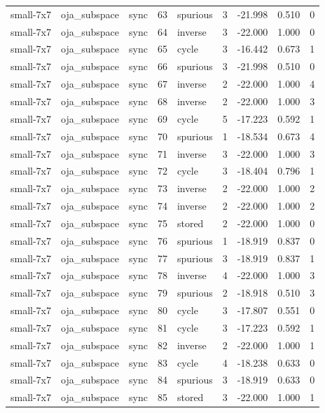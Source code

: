 \begin{tabular}{lllrlrrrr}
small-7x7 & oja\_subspace & sync & 63 & spurious & 3 & -21.998 & 0.510 & 0 \\
small-7x7 & oja\_subspace & sync & 64 & inverse & 3 & -22.000 & 1.000 & 0 \\
small-7x7 & oja\_subspace & sync & 65 & cycle & 3 & -16.442 & 0.673 & 1 \\
small-7x7 & oja\_subspace & sync & 66 & spurious & 3 & -21.998 & 0.510 & 0 \\
small-7x7 & oja\_subspace & sync & 67 & inverse & 2 & -22.000 & 1.000 & 4 \\
small-7x7 & oja\_subspace & sync & 68 & inverse & 2 & -22.000 & 1.000 & 3 \\
small-7x7 & oja\_subspace & sync & 69 & cycle & 5 & -17.223 & 0.592 & 1 \\
small-7x7 & oja\_subspace & sync & 70 & spurious & 1 & -18.534 & 0.673 & 4 \\
small-7x7 & oja\_subspace & sync & 71 & inverse & 3 & -22.000 & 1.000 & 3 \\
small-7x7 & oja\_subspace & sync & 72 & cycle & 3 & -18.404 & 0.796 & 1 \\
small-7x7 & oja\_subspace & sync & 73 & inverse & 2 & -22.000 & 1.000 & 2 \\
small-7x7 & oja\_subspace & sync & 74 & inverse & 2 & -22.000 & 1.000 & 2 \\
small-7x7 & oja\_subspace & sync & 75 & stored & 2 & -22.000 & 1.000 & 0 \\
small-7x7 & oja\_subspace & sync & 76 & spurious & 1 & -18.919 & 0.837 & 0 \\
small-7x7 & oja\_subspace & sync & 77 & spurious & 3 & -18.919 & 0.837 & 1 \\
small-7x7 & oja\_subspace & sync & 78 & inverse & 4 & -22.000 & 1.000 & 3 \\
small-7x7 & oja\_subspace & sync & 79 & spurious & 2 & -18.918 & 0.510 & 3 \\
small-7x7 & oja\_subspace & sync & 80 & cycle & 3 & -17.807 & 0.551 & 0 \\
small-7x7 & oja\_subspace & sync & 81 & cycle & 3 & -17.223 & 0.592 & 1 \\
small-7x7 & oja\_subspace & sync & 82 & inverse & 2 & -22.000 & 1.000 & 1 \\
small-7x7 & oja\_subspace & sync & 83 & cycle & 4 & -18.238 & 0.633 & 0 \\
small-7x7 & oja\_subspace & sync & 84 & spurious & 3 & -18.919 & 0.633 & 0 \\
small-7x7 & oja\_subspace & sync & 85 & stored & 3 & -22.000 & 1.000 & 1 \\

\end{tabular}

